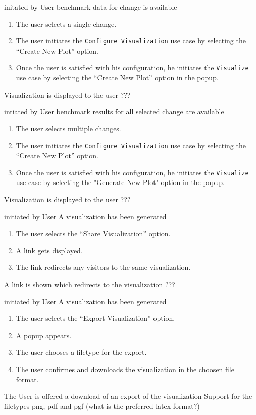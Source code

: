{initated by User}
{benchmark data for change is available}
{\begin{enumerate}
    \item The user selects a single change.
    \item The user initiates the \texttt{Configure Visualization} use case by selecting the \enquote{Create New Plot} option.
    \item Once the user is satisfied with his \gls{configuration}, he initiates the \texttt{Visualize} use case by selecting the \enquote{Create New Plot} option in the popup.
\end{enumerate}}
{Visualization is displayed to the user}
{???}

\bigskip

{intiated by User}
{benchmark results for all selected change are available}
{\begin{enumerate}
    \item The user selects multiple changes.
    \item The user initiates the \texttt{Configure Visualization} use case by selecting the \enquote{Create New Plot} option.
    \item Once the user is satisfied with his \gls{configuration}, he initiates the \texttt{Visualize} use case by selecting the "Generate New Plot" option in the popup.
\end{enumerate}}
{Visualization is displayed to the user}
{???}

\bigskip

{initiated by User}
{A \gls{visualization} has been generated}
{\begin{enumerate}
    \item The user selects the \enquote{Share Visualization} option.
    \item A link gets displayed.
    \item The link redirects any visitors to the same \gls{visualization}.
\end{enumerate}} 
{A link is shown which redirects to the \gls{visualization}}
{???}

\bigskip

{initiated by User}
{A \gls{visualization} has been generated}
{\begin{enumerate}
    \item The user selects the \enquote{Export Visualization} option.
    \item A popup appears.
    \item The user chooses a filetype for the export.
    \item The user confirmes and downloads the \gls{visualization} in the choosen file format.
\end{enumerate}} 
{The User is offered a download of an export of the \gls{visualization}}
{Support for the filetypes png, pdf and pgf (what is the preferred latex format?)}

